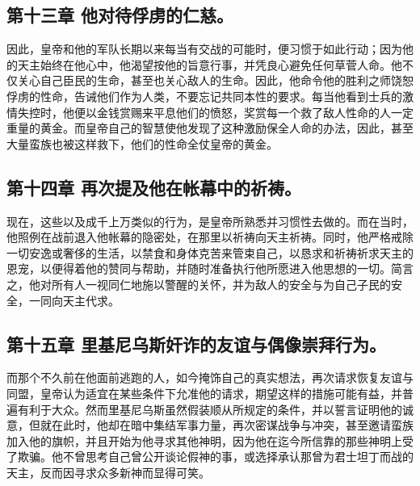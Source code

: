 
\subsection{第十三章 他对待俘虏的仁慈。}

因此，皇帝和他的军队长期以来每当有交战的可能时，便习惯于如此行动；因为他的天主始终在他心中，他渴望按他的旨意行事，并凭良心避免任何草菅人命。他不仅关心自己臣民的生命，甚至也关心敌人的生命。因此，他命令他的胜利之师饶恕俘虏的性命，告诫他们作为人类，不要忘记共同本性的要求。每当他看到士兵的激情失控时，他便以金钱赏赐来平息他们的愤怒，奖赏每一个救了敌人性命的人一定重量的黄金。而皇帝自己的智慧使他发现了这种激励保全人命的办法，因此，甚至大量蛮族也被这样救下，他们的性命全仗皇帝的黄金。\par


\subsection{第十四章 再次提及他在帐幕中的祈祷。}

现在，这些以及成千上万类似的行为，是皇帝所熟悉并习惯性去做的。而在当时，他照例在战前退入他帐幕的隐密处，在那里以祈祷向天主祈祷。同时，他严格戒除一切安逸或奢侈的生活，以禁食和身体克苦来管束自己，以恳求和祈祷祈求天主的恩宠，以便得着他的赞同与帮助，并随时准备执行他所愿进入他思想的一切。简言之，他对所有人一视同仁地施以警醒的关怀，并为敌人的安全与为自己子民的安全，一同向天主代求。\par


\subsection{第十五章 里基尼乌斯奸诈的友谊与偶像崇拜行为。}

而那个不久前在他面前逃跑的人，如今掩饰自己的真实想法，再次请求恢复友谊与同盟，皇帝认为适宜在某些条件下允准他的请求，期望这样的措施可能有益，并普遍有利于大众。然而里基尼乌斯虽然假装顺从所规定的条件，并以誓言证明他的诚意，但就在此时，他却在暗中集结军事力量，再次密谋战争与冲突，甚至邀请蛮族加入他的旗帜，并且开始为他寻求其他神明，因为他在迄今所信靠的那些神明上受了欺骗。他不曾思考自己曾公开谈论假神的事，或选择承认那曾为君士坦丁而战的天主，反而因寻求众多新神而显得可笑。\par

